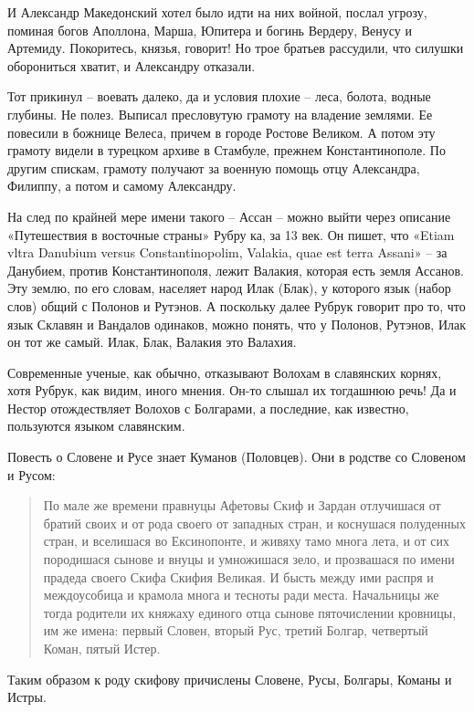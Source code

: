 И Александр Македонский хотел было идти на них войной, послал угрозу, поминая богов Аполлона, Марша, Юпитера и богинь Вердеру, Венусу и Артемиду. Покоритесь, князья, говорит! Но трое братьев рассудили, что силушки оборониться хватит, и Александру отказали. 

Тот прикинул – воевать далеко, да и условия плохие – леса, болота, водные глубины. Не полез. Выписал пресловутую грамоту на владение землями. Ее повесили в божнице Велеса, причем в городе Ростове Великом. А потом эту грамоту видели в турецком архиве в Стамбуле, прежнем Константинополе. По другим спискам, грамоту получают за военную помощь отцу Александра, Филиппу, а потом и самому Александру.

На след по крайней мере имени такого – Ассан –  можно выйти через описание «Путешествия в восточные страны» Рубру ка, за 13 век. Он пишет, что «Etiam vltra Danubium versus Constantinopolim, Valakia, quae est terra Assani» – за Данубием, против Константинополя, лежит Валакия, которая есть земля Ассанов. Эту землю, по его словам, населяет народ Илак (Блак), у которого язык (набор слов) общий с Полонов и Рутэнов. А поскольку далее Рубрук говорит про то, что язык Склавян и Вандалов одинаков, можно понять, что у Полонов, Рутэнов, Илак он тот же самый. Илак, Блак, Валакия это Валахия. 

Современные ученые, как обычно, отказывают Волохам в славянских корнях, хотя Рубрук, как видим, иного мнения. Он-то слышал их тогдашнюю речь! Да и Нестор отождествляет Волохов с Болгарами, а последние, как известно, пользуются языком славянским.

Повесть о Словене и Русе знает Куманов (Половцев). Они в родстве со Словеном и Русом:

\begin{quotation}
По мале же времени правнуцы Афетовы Скиф и Зардан отлучишася от братий своих и от рода своего от западных стран, и коснушася полуденных стран, и вселишася во Ексинопонте, и живяху тамо многа лета, и от сих породишася сынове и внуцы и умножишася зело, и прозвашася по имени прадеда своего Скифа Скифия Великая. И бысть между ими распря и междоусобица и крамола многа и тесноты ради места. Начальницы же тогда родители их княжаху единого отца сынове пяточислении кровницы, им же имена: первый Словен, вторый Рус, третий Болгар, четвертый Коман, пятый Истер.
\end{quotation}

Таким образом к роду скифову причислены Словене, Русы, Болгары, Команы и Истры.

